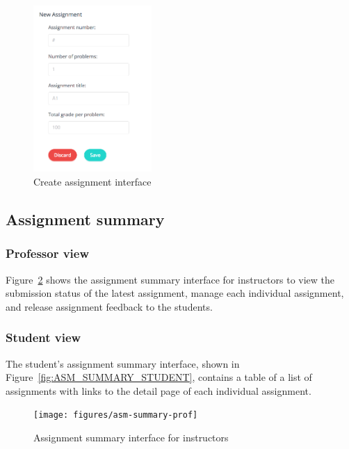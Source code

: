 \begin{figure}[H]
    \centering
        \includegraphics[width=0.4\textwidth]{figures/create-asm}
    \caption{Create assignment interface}
    \label{fig:NEW_ASM}
\end{figure}

\subsection{Assignment summary}

\subsubsection{Professor view}
Figure~\ref{fig:ASM_SUMMARY_PROF} shows the assignment summary interface for
instructors to view the submission status of the latest assignment, manage
each individual assignment, and release assignment feedback to the students.

\subsubsection{Student view}
The student's assignment summary interface, shown in
Figure~\ref{fig:ASM_SUMMARY_STUDENT}, contains a table of a list
of assignments with links to the detail page of each individual assignment.

\begin{figure}[H]
    \centering
        \texttt{[image: figures/asm-summary-prof]}
    \caption{Assignment summary interface for instructors}
    \label{fig:ASM_SUMMARY_PROF}
\end{figure}

